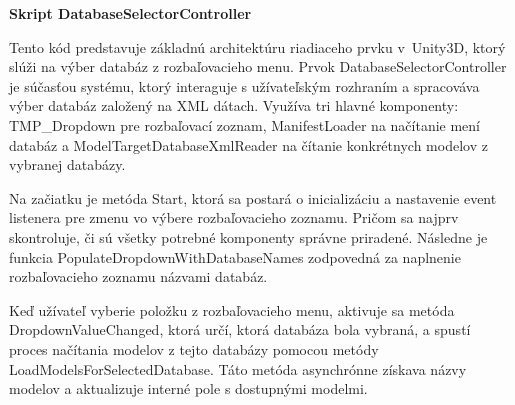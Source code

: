 {\large\textbf{Skript DatabaseSelectorController}}

Tento kód predstavuje základnú architektúru riadiaceho prvku v~Unity3D, ktorý slúži na výber databáz z rozbaľovacieho menu. Prvok DatabaseSelectorController je súčasťou systému, ktorý interaguje s užívateľským rozhraním a spracováva výber databáz založený na XML dátach. Využíva tri hlavné komponenty: TMP\_Dropdown pre rozbaľovací zoznam, ManifestLoader na načítanie mení databáz a ModelTargetDatabaseXmlReader na čítanie konkrétnych modelov z vybranej databázy.

Na začiatku je metóda Start, ktorá sa postará o inicializáciu a nastavenie event listenera pre zmenu vo výbere rozbaľovacieho zoznamu. Pričom sa najprv skontroluje, či sú všetky potrebné komponenty správne priradené. Následne je funkcia PopulateDropdownWithDatabaseNames zodpovedná za naplnenie rozbaľovacieho zoznamu názvami databáz.

Keď užívateľ vyberie položku z rozbaľovacieho menu, aktivuje sa metóda DropdownValueChanged, ktorá určí, ktorá databáza bola vybraná, a spustí proces načítania modelov z tejto databázy pomocou metódy LoadModelsForSelectedDatabase. Táto metóda asynchrónne získava názvy modelov a aktualizuje interné pole s dostupnými modelmi.

